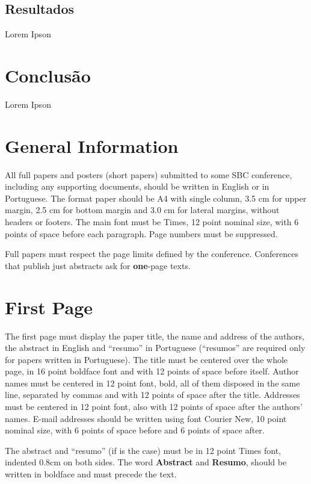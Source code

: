 \documentclass[12pt]{article}
\begin{document}
\subsection{Resultados}

Lorem Ipson

\section{Conclusão}

Lorem Ipson


\section{General Information}

All full papers and posters (short papers) submitted to some SBC conference,
including any supporting documents, should be written in English or in
Portuguese. The format paper should be A4 with single column, 3.5 cm for upper
margin, 2.5 cm for bottom margin and 3.0 cm for lateral margins, without
headers or footers. The main font must be Times, 12 point nominal size, with 6
points of space before each paragraph. Page numbers must be suppressed.

Full papers must respect the page limits defined by the conference.
Conferences that publish just abstracts ask for \textbf{one}-page texts.

\section{First Page} \label{sec:firstpage}

The first page must display the paper title, the name and address of the
authors, the abstract in English and ``resumo'' in Portuguese (``resumos'' are
required only for papers written in Portuguese). The title must be centered
over the whole page, in 16 point boldface font and with 12 points of space
before itself. Author names must be centered in 12 point font, bold, all of
them disposed in the same line, separated by commas and with 12 points of
space after the title. Addresses must be centered in 12 point font, also with
12 points of space after the authors' names. E-mail addresses should be
written using font Courier New, 10 point nominal size, with 6 points of space
before and 6 points of space after.

The abstract and ``resumo'' (if is the case) must be in 12 point Times font,
indented 0.8cm on both sides. The word \textbf{Abstract} and \textbf{Resumo},
should be written in boldface and must precede the text.
\end{document}
